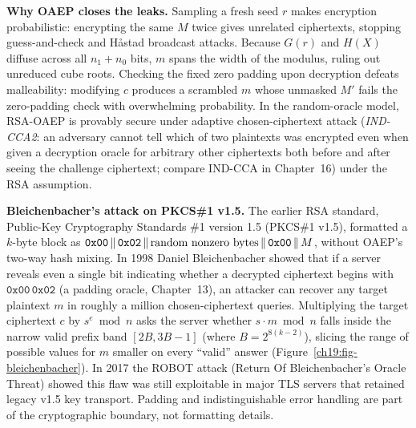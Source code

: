 \begin{whybox}
\textbf{Why OAEP closes the leaks.} Sampling a fresh seed $r$ makes encryption probabilistic: encrypting the same $M$ twice gives unrelated ciphertexts, stopping guess-and-check and H\r{a}stad broadcast attacks. Because $G(r)$ and $H(X)$ diffuse across all $n_1 + n_0$ bits, $m$ spans the width of the modulus, ruling out unreduced cube roots. Checking the fixed zero padding upon decryption defeats malleability: modifying $c$ produces a scrambled $m$ whose unmasked $M'$ fails the zero-padding check with overwhelming probability. In the random-oracle model, RSA-OAEP is provably secure under adaptive chosen-ciphertext attack (\emph{IND-CCA2}: an adversary cannot tell which of two plaintexts was encrypted even when given a decryption oracle for arbitrary other ciphertexts both before and after seeing the challenge ciphertext; compare IND-CCA in Chapter~16) under the RSA assumption.
\end{whybox}

\begin{attackbox}
\textbf{Bleichenbacher's attack on PKCS\#1 v1.5.} The earlier RSA standard, Public-Key Cryptography Standards \#1 version 1.5 (PKCS\#1 v1.5), formatted a $k$-byte block as $\mathtt{0x00} \,\|\, \mathtt{0x02} \,\|\, \text{random nonzero bytes} \,\|\, \mathtt{0x00} \,\|\, M$, without OAEP's two-way hash mixing. In 1998 Daniel Bleichenbacher showed that if a server reveals even a single bit indicating whether a decrypted ciphertext begins with $\mathtt{0x00\,0x02}$ (a padding oracle, Chapter~13), an attacker can recover any target plaintext $m$ in roughly a million chosen-ciphertext queries. Multiplying the target ciphertext $c$ by $s^e \bmod n$ asks the server whether $s \cdot m \bmod n$ falls inside the narrow valid prefix band $[2B, 3B-1]$ (where $B = 2^{8(k-2)}$), slicing the range of possible values for $m$ smaller on every ``valid'' answer (Figure~\ref{ch19:fig-bleichenbacher}). In 2017 the ROBOT attack (Return Of Bleichenbacher's Oracle Threat) showed this flaw was still exploitable in major TLS servers that retained legacy v1.5 key transport. Padding and indistinguishable error handling are part of the cryptographic boundary, not formatting details.
\end{attackbox}

